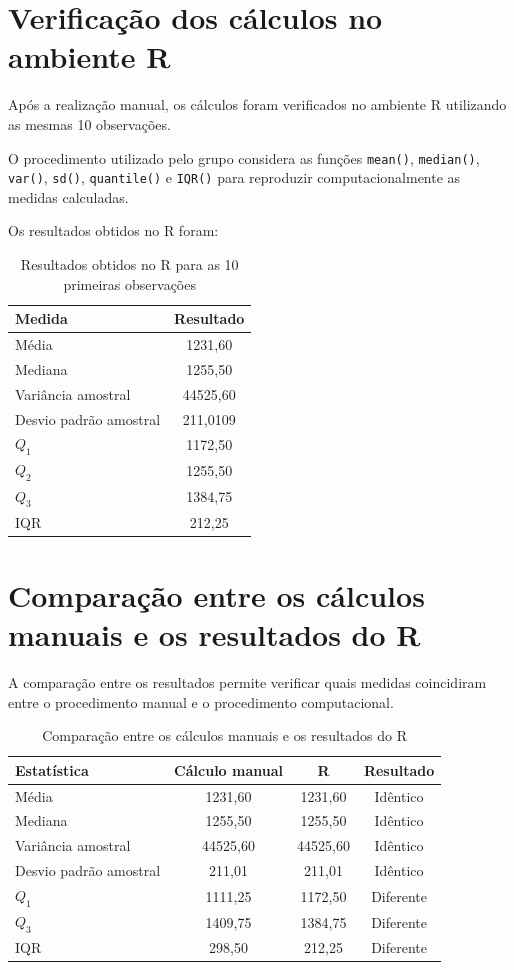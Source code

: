 \documentclass[12pt,a4paper]{article}
\begin{document}
\section{Verificação dos cálculos no ambiente R}

Após a realização manual, os cálculos foram verificados no ambiente R utilizando
as mesmas 10 observações.

O procedimento utilizado pelo grupo considera as funções \texttt{mean()},
\texttt{median()}, \texttt{var()}, \texttt{sd()}, \texttt{quantile()} e
\texttt{IQR()} para reproduzir computacionalmente as medidas calculadas.

Os resultados obtidos no R foram:

\begin{table}[H]
\centering
\caption{Resultados obtidos no R para as 10 primeiras observações}
\begin{tabular}{lc}
\toprule
\textbf{Medida} & \textbf{Resultado} \\
\midrule
Média & 1231,60 \\
Mediana & 1255,50 \\
Variância amostral & 44525,60 \\
Desvio padrão amostral & 211,0109 \\
$Q_1$ & 1172,50 \\
$Q_2$ & 1255,50 \\
$Q_3$ & 1384,75 \\
IQR & 212,25 \\
\bottomrule
\end{tabular}
\end{table}

\section{Comparação entre os cálculos manuais e os resultados do R}

A comparação entre os resultados permite verificar quais medidas coincidiram
entre o procedimento manual e o procedimento computacional.

\begin{table}[H]
\centering
\caption{Comparação entre os cálculos manuais e os resultados do R}
\begin{tabular}{lccc}
\toprule
\textbf{Estatística} &
\textbf{Cálculo manual} &
\textbf{R} &
\textbf{Resultado} \\
\midrule
Média & 1231,60 & 1231,60 & Idêntico \\
Mediana & 1255,50 & 1255,50 & Idêntico \\
Variância amostral & 44525,60 & 44525,60 & Idêntico \\
Desvio padrão amostral & 211,01 & 211,01 & Idêntico \\
$Q_1$ & 1111,25 & 1172,50 & Diferente \\
$Q_3$ & 1409,75 & 1384,75 & Diferente \\
IQR & 298,50 & 212,25 & Diferente \\
\bottomrule
\end{tabular}
\end{table}
\end{document}
